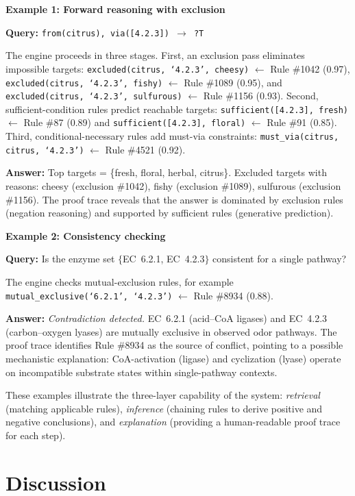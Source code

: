 \documentclass[a4paper,fleqn]{cas-sc}
\begin{document}
\noindent\textbf{Example 1: Forward reasoning with exclusion}

\noindent\textbf{Query:} \texttt{from(citrus), via([4.2.3]) $\rightarrow$ ?T}

\medskip\noindent The engine proceeds in three stages. First, an exclusion pass eliminates impossible targets: \texttt{excluded(citrus, `4.2.3', cheesy)} $\leftarrow$ Rule \#1042 (0.97), \texttt{excluded(citrus, `4.2.3', fishy)} $\leftarrow$ Rule \#1089 (0.95), and \texttt{excluded(citrus, `4.2.3', sulfurous)} $\leftarrow$ Rule \#1156 (0.93). Second, sufficient-condition rules predict reachable targets: \texttt{sufficient([4.2.3], fresh)} $\leftarrow$ Rule \#87 (0.89) and \texttt{sufficient([4.2.3], floral)} $\leftarrow$ Rule \#91 (0.85). Third, conditional-necessary rules add must-via constraints: \texttt{must\_via(citrus, citrus, `4.2.3')} $\leftarrow$ Rule \#4521 (0.92).

\noindent\textbf{Answer:} Top targets = \{fresh, floral, herbal, citrus\}. Excluded targets with reasons: cheesy (exclusion \#1042), fishy (exclusion \#1089), sulfurous (exclusion \#1156). The proof trace reveals that the answer is dominated by exclusion rules (negation reasoning) and supported by sufficient rules (generative prediction).

\noindent\textbf{Example 2: Consistency checking}

\noindent\textbf{Query:} Is the enzyme set $\{$EC~6.2.1, EC~4.2.3$\}$ consistent for a single pathway?

\medskip\noindent The engine checks mutual-exclusion rules, for example \texttt{mutual\_exclusive(`6.2.1', `4.2.3')} $\leftarrow$ Rule \#8934 (0.88).

\noindent\textbf{Answer:} \emph{Contradiction detected.} EC~6.2.1 (acid--CoA ligases) and EC~4.2.3 (carbon--oxygen lyases) are mutually exclusive in observed odor pathways. The proof trace identifies Rule \#8934 as the source of conflict, pointing to a possible mechanistic explanation: CoA-activation (ligase) and cyclization (lyase) operate on incompatible substrate states within single-pathway contexts.

\medskip
These examples illustrate the three-layer capability of the system: \emph{retrieval} (matching applicable rules), \emph{inference} (chaining rules to derive positive and negative conclusions), and \emph{explanation} (providing a human-readable proof trace for each step).

\section{Discussion}\label{sec:discussion}
\end{document}
